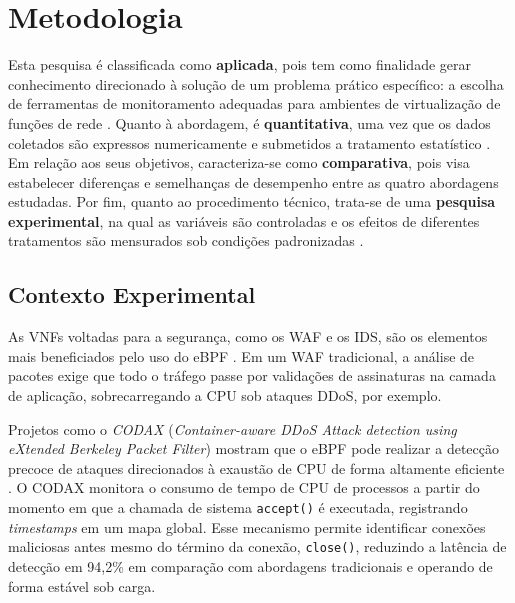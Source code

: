 
\chapter{Metodologia}
\label{chap:metodologia}

Esta pesquisa é classificada como \textbf{aplicada}, pois tem como finalidade gerar conhecimento direcionado à solução de um problema prático específico: a escolha de ferramentas de monitoramento adequadas para ambientes de virtualização de funções de rede \cite{gil2021}. Quanto à abordagem, é \textbf{quantitativa}, uma vez que os dados coletados são expressos numericamente e submetidos a tratamento estatístico \cite{marconi2017}. Em relação aos seus objetivos, caracteriza-se como \textbf{comparativa}, pois visa estabelecer diferenças e semelhanças de desempenho entre as quatro abordagens estudadas. Por fim, quanto ao procedimento técnico, trata-se de uma \textbf{pesquisa experimental}, na qual as variáveis são controladas e os efeitos de diferentes tratamentos são mensurados sob condições padronizadas \cite{gil2021}.




\section{Contexto Experimental}
\label{sec:ambiente}

As VNFs voltadas para a segurança, como os WAF e os IDS, são os elementos mais beneficiados pelo uso do eBPF \cite{technologies12080122}. Em um WAF tradicional, a análise de pacotes exige que todo o tráfego passe por validações de assinaturas na camada de aplicação, sobrecarregando a CPU sob ataques DDoS, por exemplo.

Projetos como o \textit{CODAX} (\textit{Container-aware DDoS Attack detection using eXtended Berkeley Packet Filter}) mostram que o eBPF pode realizar a detecção precoce de ataques direcionados à exaustão de CPU de forma altamente eficiente \cite{codax2025remya}. O CODAX monitora o consumo de tempo de CPU de processos a partir do momento em que a chamada de sistema \texttt{accept()} é executada, registrando \textit{timestamps} em um mapa global. Esse mecanismo permite identificar conexões maliciosas antes mesmo do término da conexão, \texttt{close()}, reduzindo a latência de detecção em 94,2\% em comparação com abordagens tradicionais e operando de forma estável sob carga.


